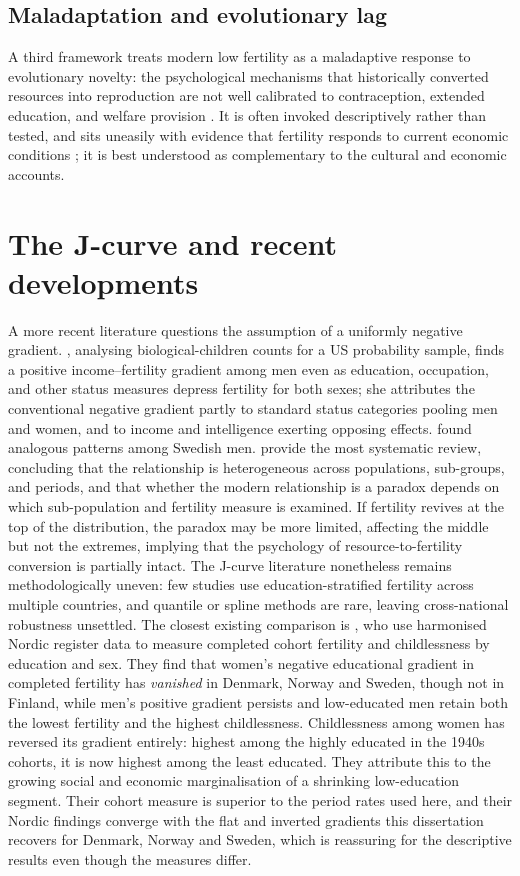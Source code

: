 \documentclass[12pt,a4paper]{report}
\begin{document}
\subsection{Maladaptation and evolutionary lag}
A third framework treats modern low fertility as a maladaptive response to evolutionary novelty:
the psychological mechanisms that historically converted resources into reproduction are not
well calibrated to contraception, extended education, and welfare provision
\citep{perusse1993,kanazawa2003}. It is often invoked descriptively rather than tested, and sits
uneasily with evidence that fertility responds to current economic conditions \citep{sobotka2011};
it is best understood as complementary to the cultural and economic accounts.

\section{The J-curve and recent developments}
A more recent literature questions the assumption of a uniformly negative gradient.
\citet{hopcroft2006}, analysing biological-children counts for a US probability sample, finds a
positive income--fertility gradient among men even as education, occupation, and other status
measures depress fertility for both sexes; she attributes the conventional negative gradient partly
to standard status categories pooling men and women, and to income and intelligence exerting
opposing effects. \citet{fiederhuber2007} found analogous
patterns among Swedish men. \citet{stulpbarrett2016} provide the most systematic review,
concluding that the relationship is heterogeneous across populations, sub-groups, and periods,
and that whether the modern relationship is a paradox depends on which sub-population and fertility
measure is examined. If fertility revives at the top of the distribution, the paradox may be more
limited, affecting the middle but not the extremes, implying that the psychology of
resource-to-fertility conversion is partially intact. The J-curve literature nonetheless remains
methodologically uneven: few studies use education-stratified fertility across multiple countries,
and quantile or spline methods are rare, leaving cross-national robustness unsettled. The closest
existing comparison is \citet{jalovaara2019}, who use harmonised Nordic register data to measure
completed cohort fertility and childlessness by education and sex. They find that women's negative
educational gradient in completed fertility has \emph{vanished} in Denmark, Norway and Sweden, though
not in Finland, while men's positive gradient persists and low-educated men retain both the lowest
fertility and the highest childlessness. Childlessness among women has reversed its gradient
entirely: highest among the highly educated in the 1940s cohorts, it is now highest among the least
educated. They attribute this to the growing social and economic marginalisation of a shrinking
low-education segment. Their cohort measure is superior to the period rates used here, and their
Nordic findings converge with the flat and inverted gradients this dissertation recovers for Denmark,
Norway and Sweden, which is reassuring for the descriptive results even though the measures differ.
\end{document}
